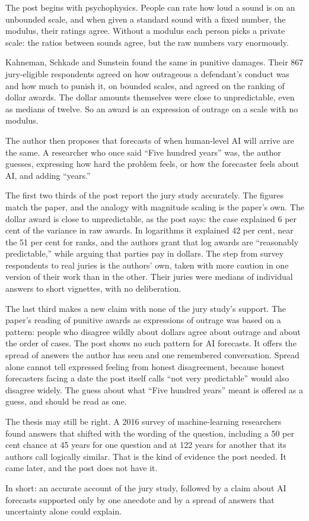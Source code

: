 \begin{afterword}
\summaryhead

The post begins with psychophysics. People can rate how loud a sound is on an unbounded scale, and when given a standard sound with a fixed number, the modulus, their ratings agree. Without a modulus each person picks a private scale: the ratios between sounds agree, but the raw numbers vary enormously.

Kahneman, Schkade and Sunstein found the same in punitive damages. Their 867 jury-eligible respondents agreed on how outrageous a defendant's conduct was and how much to punish it, on bounded scales, and agreed on the ranking of dollar awards. The dollar amounts themselves were close to unpredictable, even as medians of twelve. So an award is an expression of outrage on a scale with no modulus.

The author then proposes that forecasts of when human-level AI will arrive are the same. A researcher who once said ``Five hundred years'' was, the author guesses, expressing how hard the problem feels, or how the forecaster feels about AI, and adding ``years.''

\responsehead

The first two thirds of the post report the jury study accurately. The figures match the paper, and the analogy with magnitude scaling is the paper's own. The dollar award is close to unpredictable, as the post says: the case explained 6 per cent of the variance in raw awards. In logarithms it explained 42 per cent, near the 51 per cent for ranks, and the authors grant that log awards are ``reasonably predictable,'' while arguing that parties pay in dollars. The step from survey respondents to real juries is the authors' own, taken with more caution in one version of their work than in the other. Their juries were medians of individual answers to short vignettes, with no deliberation.

The last third makes a new claim with none of the jury study's support. The paper's reading of punitive awards as expressions of outrage was based on a pattern: people who disagree wildly about dollars agree about outrage and about the order of cases. The post shows no such pattern for AI forecasts. It offers the spread of answers the author has seen and one remembered conversation. Spread alone cannot tell expressed feeling from honest disagreement, because honest forecasters facing a date the post itself calls ``not very predictable'' would also disagree widely. The guess about what ``Five hundred years'' meant is offered as a guess, and should be read as one.

The thesis may still be right. A 2016 survey of machine-learning researchers found answers that shifted with the wording of the question, including a 50 per cent chance at 45 years for one question and at 122 years for another that its authors call logically similar. That is the kind of evidence the post needed. It came later, and the post does not have it.

In short: an accurate account of the jury study, followed by a claim about AI forecasts supported only by one anecdote and by a spread of answers that uncertainty alone could explain.
\end{afterword}
